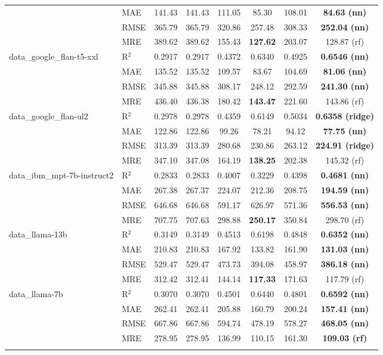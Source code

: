 \begin{table}[t]
\begin{tabular}{llcccccc}
 & MAE & 141.43 & 141.43 & 111.05 & 85.30 & 108.01 & \textbf{84.63 (nn)} \\
 & RMSE & 365.79 & 365.79 & 320.86 & 257.48 & 308.33 & \textbf{252.04 (nn)} \\
 & MRE & 389.62 & 389.62 & 155.43 & \textbf{127.62} & 203.07 & 128.87 (rf) \\
\addlinespace
data\_google\_flan-t5-xxl & R$^2$ & 0.2917 & 0.2917 & 0.4372 & 0.6340 & 0.4925 & \textbf{0.6546 (nn)} \\
 & MAE & 135.52 & 135.52 & 109.57 & 83.67 & 104.69 & \textbf{81.06 (nn)} \\
 & RMSE & 345.88 & 345.88 & 308.17 & 248.12 & 292.59 & \textbf{241.30 (nn)} \\
 & MRE & 436.40 & 436.38 & 180.42 & \textbf{143.47} & 221.60 & 143.86 (rf) \\
\addlinespace
data\_google\_flan-ul2 & R$^2$ & 0.2978 & 0.2978 & 0.4359 & 0.6149 & 0.5034 & \textbf{0.6358 (ridge)} \\
 & MAE & 122.86 & 122.86 & 99.26 & 78.21 & 94.12 & \textbf{77.75 (nn)} \\
 & RMSE & 313.39 & 313.39 & 280.68 & 230.86 & 263.12 & \textbf{224.91 (ridge)} \\
 & MRE & 347.10 & 347.08 & 164.19 & \textbf{138.25} & 202.38 & 145.32 (rf) \\
\addlinespace
data\_ibm\_mpt-7b-instruct2 & R$^2$ & 0.2833 & 0.2833 & 0.4007 & 0.3229 & 0.4398 & \textbf{0.4681 (nn)} \\
 & MAE & 267.38 & 267.37 & 224.07 & 212.36 & 208.75 & \textbf{194.59 (nn)} \\
 & RMSE & 646.68 & 646.68 & 591.17 & 626.97 & 571.36 & \textbf{556.53 (nn)} \\
 & MRE & 707.75 & 707.63 & 298.88 & \textbf{250.17} & 350.84 & 298.70 (rf) \\
\addlinespace
data\_llama-13b & R$^2$ & 0.3149 & 0.3149 & 0.4513 & 0.6198 & 0.4848 & \textbf{0.6352 (nn)} \\
 & MAE & 210.83 & 210.83 & 167.92 & 133.82 & 161.90 & \textbf{131.03 (nn)} \\
 & RMSE & 529.47 & 529.47 & 473.73 & 394.08 & 458.97 & \textbf{386.18 (nn)} \\
 & MRE & 312.42 & 312.41 & 144.14 & \textbf{117.33} & 171.63 & 117.79 (rf) \\
\addlinespace
data\_llama-7b & R$^2$ & 0.3070 & 0.3070 & 0.4501 & 0.6440 & 0.4801 & \textbf{0.6592 (nn)} \\
 & MAE & 262.41 & 262.41 & 205.88 & 160.79 & 200.24 & \textbf{157.41 (nn)} \\
 & RMSE & 667.86 & 667.86 & 594.74 & 478.19 & 578.27 & \textbf{468.05 (nn)} \\
 & MRE & 278.95 & 278.95 & 136.99 & 110.15 & 161.30 & \textbf{109.03 (rf)} \\
\addlinespace
\bottomrule
\end{tabular}
\end{table}